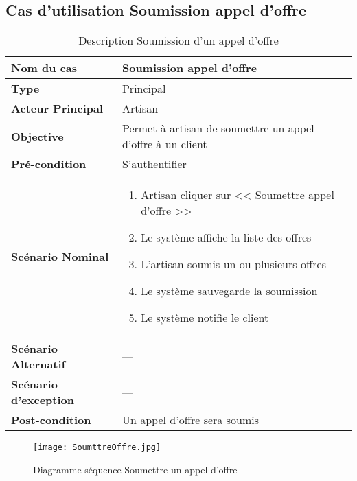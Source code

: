 \subsection{Cas d'utilisation Soumission appel d'offre}
\renewcommand{\arraystretch}{2}
\begin{center}
	\begin{table}[H]
		\centering
		\tiny{\begin{tabular}{ | l | m{0.51\textheight}|}
				\hline
				\rowcolor[HTML]{06a8ed}
				\textbf{Nom du cas} & Soumission appel d'offre \\
				\hline\hline
				\cellcolor[HTML]{99ccff} \textbf{Type} & Principal \\
				\hline
				\cellcolor[HTML]{99ccff} \textbf{Acteur Principal} & Artisan\\
				\hline
				\cellcolor[HTML]{99ccff} \textbf{Objective} & Permet à artisan de soumettre un appel d'offre à un client\\
				\hline
				\cellcolor[HTML]{99ccff} \textbf{Pré-condition} & S'authentifier\\
				\hline
				\cellcolor[HTML]{99ccff} \textbf{Scénario Nominal} & \parbox{0.43\textheight}{
					\begin{enumerate}
						\vspace{0.01\textheight}
						\item Artisan cliquer sur << Soumettre appel d’offre >>
						\item Le système affiche la liste des offres
						\item L'artisan soumis un ou plusieurs offres
						\item Le système sauvegarde la soumission
						\item Le système notifie le client
						\vspace{0.01\textheight}
				\end{enumerate}}\\
				\hline
				 \textbf{Scénario Alternatif} & --- \\
				\hline
				 \textbf{Scénario d'exception} & --- \\
				\hline
				 \textbf{Post-condition} & Un appel d'offre sera soumis\\
				\hline
		\end{tabular}}
		\caption{Description Soumission d'un appel d'offre}
		\label{table:soumettre offre}
	\end{table}
	\begin{figure}[H]
		\centering
		\texttt{[image: SoumttreOffre.jpg]}
		\caption{Diagramme séquence Soumettre un appel d'offre}
		\label{fig:seq soumettre offre}
	\end{figure}
\end{center}


